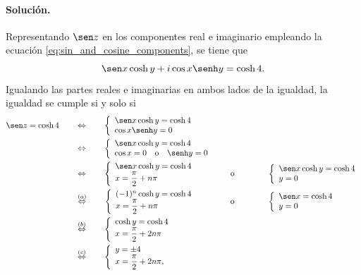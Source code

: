 \documentclass[a4paper]{report}
\begin{document}
\paragraph{Solución.} Representando \(\sen z\) en los componentes real e imaginario empleando la ecuación \ref{eq:sin_and_cosine_components}, se tiene que 
\[
 \sen x\cosh y+i\cos x\senh y=\cosh4.
\]
Igualando las partes reales e imaginarias en ambos lados de la igualdad, la igualdad se cumple si y solo si
\begin{align*}
 \sen z=\cosh 4
 \qquad&\Leftrightarrow\qquad
  \left\{ 
  \begin{array}{l}
   \sen x\cosh y=\cosh4\\
   \cos x\senh y=0
  \end{array}\right.\\
 \qquad&\Leftrightarrow\qquad
  \left\{ 
  \begin{array}{l}
   \sen x\cosh y=\cosh4\\
   \cos x=0\quad\textrm{o}\quad\senh y=0
  \end{array}\right.\\
  \qquad&\Leftrightarrow\qquad
  \left\{ 
  \begin{array}{l}
   \sen x\cosh y=\cosh4\\
   x=\dfrac{\pi}{2}+n\pi
  \end{array}\right.
  \qquad\qquad\textrm{o}\qquad\qquad
  \left\{ 
  \begin{array}{l}
   \sen x\cosh y=\cosh4\\
   y=0
  \end{array}\right.\\
  \qquad&\overset{(a)}{\Leftrightarrow}\qquad
  \left\{ 
  \begin{array}{l}
   (-1)^n\cosh y=\cosh4\\
   x=\dfrac{\pi}{2}+n\pi
  \end{array}\right.
  \qquad\qquad\textrm{o}\qquad\qquad
  \left\{ 
  \begin{array}{l}
   \sen x=\cosh4\\
   y=0
  \end{array}\right.\\
  \qquad&\overset{(b)}{\Leftrightarrow}\qquad
  \left\{ 
  \begin{array}{l}
   \cosh y=\cosh4\\
   x=\dfrac{\pi}{2}+2n\pi
  \end{array}\right.\\
  \qquad&\overset{(c)}{\Leftrightarrow}\qquad
  \left\{ 
  \begin{array}{l}
   y=\pm4\\
   x=\dfrac{\pi}{2}+2n\pi,
  \end{array}\right.
\end{align*}
\end{document}
